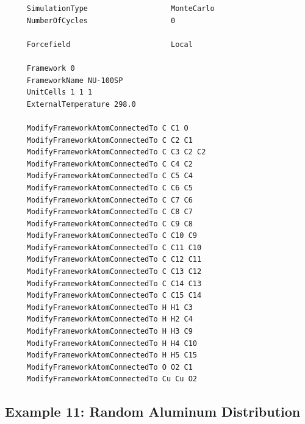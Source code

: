\begin{tiny}
\begin{verbatim}
     SimulationType                   MonteCarlo
     NumberOfCycles                   0
     
     Forcefield                       Local
     
     Framework 0
     FrameworkName NU-100SP
     UnitCells 1 1 1
     ExternalTemperature 298.0
     
     ModifyFrameworkAtomConnectedTo C C1 O
     ModifyFrameworkAtomConnectedTo C C2 C1
     ModifyFrameworkAtomConnectedTo C C3 C2 C2
     ModifyFrameworkAtomConnectedTo C C4 C2
     ModifyFrameworkAtomConnectedTo C C5 C4
     ModifyFrameworkAtomConnectedTo C C6 C5
     ModifyFrameworkAtomConnectedTo C C7 C6
     ModifyFrameworkAtomConnectedTo C C8 C7
     ModifyFrameworkAtomConnectedTo C C9 C8
     ModifyFrameworkAtomConnectedTo C C10 C9
     ModifyFrameworkAtomConnectedTo C C11 C10
     ModifyFrameworkAtomConnectedTo C C12 C11
     ModifyFrameworkAtomConnectedTo C C13 C12
     ModifyFrameworkAtomConnectedTo C C14 C13
     ModifyFrameworkAtomConnectedTo C C15 C14
     ModifyFrameworkAtomConnectedTo H H1 C3
     ModifyFrameworkAtomConnectedTo H H2 C4
     ModifyFrameworkAtomConnectedTo H H3 C9
     ModifyFrameworkAtomConnectedTo H H4 C10
     ModifyFrameworkAtomConnectedTo H H5 C15
     ModifyFrameworkAtomConnectedTo O O2 C1
     ModifyFrameworkAtomConnectedTo Cu Cu O2
\end{verbatim}
\end{tiny}

\subsection*{Example 11: Random Aluminum Distribution}

